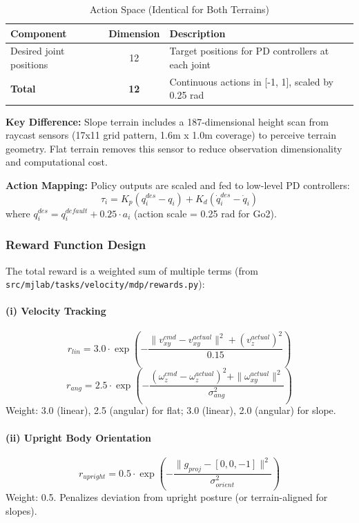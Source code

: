 \documentclass[12pt,a4paper]{article}
\begin{document}
\begin{table}[h]
\centering
\caption{Action Space (Identical for Both Terrains)}
\small
\begin{tabular}{|l|c|p{7cm}|}
\hline
\textbf{Component} & \textbf{Dimension} & \textbf{Description} \\
\hline
Desired joint positions & 12 & Target positions for PD controllers at each joint \\
\hline
\textbf{Total} & \textbf{12} & Continuous actions in [-1, 1], scaled by 0.25 rad \\
\hline
\end{tabular}
\end{table}

\textbf{Key Difference:} Slope terrain includes a 187-dimensional height scan from raycast sensors (17x11 grid pattern, 1.6m x 1.0m coverage) to perceive terrain geometry. Flat terrain removes this sensor to reduce observation dimensionality and computational cost.

\textbf{Action Mapping:} Policy outputs are scaled and fed to low-level PD controllers:
\begin{equation}
\tau_i = K_p(q_i^{des} - q_i) + K_d(\dot{q}_i^{des} - \dot{q}_i)
\end{equation}
where $q_i^{des} = q_i^{default} + 0.25 \cdot a_i$ (action scale = 0.25 rad for Go2).

\subsubsection{Reward Function Design}

The total reward is a weighted sum of multiple terms (from \texttt{src/mjlab/tasks/velocity/mdp/rewards.py}):

\paragraph{(i) Velocity Tracking}
\begin{equation}
r_{lin} = 3.0 \cdot \exp\left(-\frac{\|v_{xy}^{cmd} - v_{xy}^{actual}\|^2 + (v_z^{actual})^2}{0.15}\right)
\end{equation}
\begin{equation}
r_{ang} = 2.5 \cdot \exp\left(-\frac{(\omega_z^{cmd} - \omega_z^{actual})^2 + \|\omega_{xy}^{actual}\|^2}{\sigma_{ang}^2}\right)
\end{equation}
Weight: 3.0 (linear), 2.5 (angular) for flat; 3.0 (linear), 2.0 (angular) for slope.

\paragraph{(ii) Upright Body Orientation}
\begin{equation}
r_{upright} = 0.5 \cdot \exp\left(-\frac{\|g_{proj} - [0,0,-1]\|^2}{\sigma_{orient}^2}\right)
\end{equation}
Weight: 0.5. Penalizes deviation from upright posture (or terrain-aligned for slopes).
\end{document}

